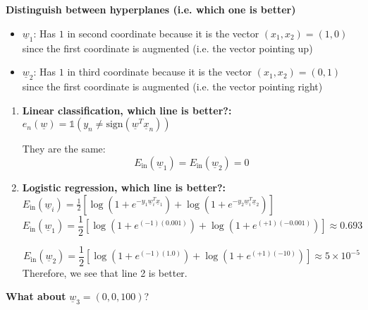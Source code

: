     \begin{example}
        \textbf{Distinguish between hyperplanes (i.e. which one is better)}

        \begin{itemize}
            \item $\underline{w}_1$: Has $1$ in second coordinate because it is the vector $(x_1,x_2)=(1,0)$ since the first coordinate is augmented (i.e. the vector pointing up) 
            \item $\underline{w}_2$: Has $1$ in third coordinate because it is the vector $(x_1,x_2)=(0,1)$ since the first coordinate is augmented (i.e. the vector pointing right) 
        \end{itemize}
        \begin{enumerate}
            \item \textbf{Linear classification, which line is better?:} $e_n(\underline{w}) = \mathbb{1}(y_n \neq \text{sign}(\underline{w}^T \underline{x}_n))$
            
            They are the same:
            \[
            E_{\text{in}}(\underline{w}_1) = E_{\text{in}}(\underline{w}_2) = 0
            \]

            \item \textbf{Logistic regression, which line is better?:} $E_{\text{in}}(\underline{w}_i) = \frac{1}{2} \left[ \log(1 + e^{-y_1 \underline{w}_i^T \underline{x}_1}) + \log(1 + e^{-y_2 \underline{w}_i^T \underline{x}_2}) \right]$ 
                \[
                E_{\text{in}}(\underline{w}_1) = \frac{1}{2} \left[ \log(1 + e^{(-1)(0.001)}) + \log(1 + e^{(+1)(-0.001)}) \right] \approx 0.693
                \]
                
                \[
                E_{\text{in}}(\underline{w}_2) = \frac{1}{2} \left[ \log(1 + e^{(-1)(1.0)}) + \log(1 + e^{(+1)(-10)}) \right] \approx 5 \times 10^{-5}
                \]
                Therefore, we see that line 2 is better. 
        \end{enumerate}
        \vspace{1em}

        \textbf{What about} \(\underline{w}_3 = (0, 0, 100)\)?


\end{example}
